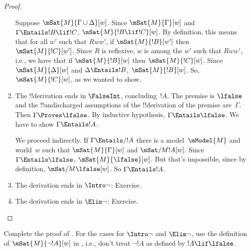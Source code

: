 \documentclass[../../../include/open-logic-section]{subfiles}
\begin{document}
\begin{proof}
\begin{enumerate}
    Suppose $\mSat{M}{\Gamma \cup \Delta}[w]$. Since
    $\mSat{M}{\Gamma}[w]$ and $\Gamma \Entails !B \lif !C$,
    $\mSat{M}{!B \lif !C}[w]$. By definition, this means that for all
    $w'$ such that $Rww'$, if $\mSat{M}{!B}[w']$ then
    $\mSat{M}{!C}[w']$. Since $R$ is reflexive, $w$ is among the $w'$
    such that $Rww'$, i.e., we have that if $\mSat{M}{!B}[w]$ then
    $\mSat{M}{!C}[w]$. Since $\mSat{M}{\Delta}[w]$ and $\Delta
    \Entails !B$, $\mSat{M}{!B}[w]$. So, $\mSat{M}{!C}[w]$, as we
    wanted to show.

  \item The !!{derivation} ends in $\FalseInt$, concluding~$!A$. The
    premise is $\lfalse$ and the !!{undischarged} assumptions of the
    !!{derivation} of the premise are~$\Gamma$. Then $\Gamma \Proves
    \lfalse$. By inductive hypothesis, $\Gamma \Entails \lfalse$. We
    have to show $\Gamma \Entails !A$.

    We proceed indirectly. If $\Gamma \Entails/ !A$ there is a
    model~$\mModel{M}$ and world~$w$ such that $\mSat{M}{\Gamma}[w]$
    and $\mSat/{M}{!A}[w]$.  Since $\Gamma \Entails \lfalse$,
    $\mSat{M}{\lfalse}[w]$. But that's impossible, since by
    definition, $\mSat/{M}{\lfalse}[w]$. So $\Gamma \Entails !A$.
  \item The derivation ends in $\Intro\lnot$: Exercise.
  \item The derivation ends in $\Elim\lnot$: Exercise.
  \end{enumerate}
\end{proof}

\begin{prob}
  Complete the proof of . For the
  cases for $\Intro\lnot$ and $\Elim\lnot$, use the definition of
  $\mSat{M}{\lnot !A}[w]$ in , i.e.,
  don't treat $\lnot !A$ as defined by $!A \lif \lfalse$.
\end{prob}
\end{document}
